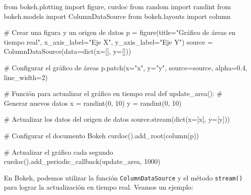 \documentclass[
  a4paper,
]{article}
\newenvironment{Shaded}{}{}
\newcommand{\BuiltInTok}[1]{\textcolor[rgb]{0.84,0.23,0.29}{#1}}
\newcommand{\CommentTok}[1]{\textcolor[rgb]{0.42,0.45,0.49}{#1}}
\newcommand{\DecValTok}[1]{\textcolor[rgb]{0.00,0.36,0.77}{#1}}
\newcommand{\FloatTok}[1]{\textcolor[rgb]{0.00,0.36,0.77}{#1}}
\newcommand{\ImportTok}[1]{\textcolor[rgb]{0.01,0.18,0.38}{#1}}
\newcommand{\KeywordTok}[1]{\textcolor[rgb]{0.84,0.23,0.29}{#1}}
\newcommand{\NormalTok}[1]{\textcolor[rgb]{0.14,0.16,0.18}{#1}}
\newcommand{\OperatorTok}[1]{\textcolor[rgb]{0.14,0.16,0.18}{#1}}
\newcommand{\StringTok}[1]{\textcolor[rgb]{0.01,0.18,0.38}{#1}}
\begin{document}
\begin{Shaded}
\begin{Highlighting}[]
\ImportTok{from}\NormalTok{ bokeh.plotting }\ImportTok{import}\NormalTok{ figure, curdoc}
\ImportTok{from}\NormalTok{ random }\ImportTok{import}\NormalTok{ randint}
\ImportTok{from}\NormalTok{ bokeh.models }\ImportTok{import}\NormalTok{ ColumnDataSource}
\ImportTok{from}\NormalTok{ bokeh.layouts }\ImportTok{import}\NormalTok{ column}

\CommentTok{\# Crear una figura y un origen de datos}
\NormalTok{p }\OperatorTok{=}\NormalTok{ figure(title}\OperatorTok{=}\StringTok{"Gráfico de áreas en tiempo real"}\NormalTok{, x\_axis\_label}\OperatorTok{=}\StringTok{"Eje X"}\NormalTok{, y\_axis\_label}\OperatorTok{=}\StringTok{"Eje Y"}\NormalTok{)}
\NormalTok{source }\OperatorTok{=}\NormalTok{ ColumnDataSource(data}\OperatorTok{=}\BuiltInTok{dict}\NormalTok{(x}\OperatorTok{=}\NormalTok{[], y}\OperatorTok{=}\NormalTok{[]))}

\CommentTok{\# Configurar el gráfico de áreas}
\NormalTok{p.patch(x}\OperatorTok{=}\StringTok{"x"}\NormalTok{, y}\OperatorTok{=}\StringTok{"y"}\NormalTok{, source}\OperatorTok{=}\NormalTok{source, alpha}\OperatorTok{=}\FloatTok{0.4}\NormalTok{, line\_width}\OperatorTok{=}\DecValTok{2}\NormalTok{)}

\CommentTok{\# Función para actualizar el gráfico en tiempo real}
\KeywordTok{def}\NormalTok{ update\_area():}
    \CommentTok{\# Generar nuevos datos}
\NormalTok{    x }\OperatorTok{=}\NormalTok{ randint(}\DecValTok{0}\NormalTok{, }\DecValTok{10}\NormalTok{)}
\NormalTok{    y }\OperatorTok{=}\NormalTok{ randint(}\DecValTok{0}\NormalTok{, }\DecValTok{10}\NormalTok{)}

    \CommentTok{\# Actualizar los datos del origen de datos}
\NormalTok{    source.stream(}\BuiltInTok{dict}\NormalTok{(x}\OperatorTok{=}\NormalTok{[x], y}\OperatorTok{=}\NormalTok{[y]))}

\CommentTok{\# Configurar el documento Bokeh}
\NormalTok{curdoc().add\_root(column(p))}

\CommentTok{\# Actualizar el gráfico cada segundo}
\NormalTok{curdoc().add\_periodic\_callback(update\_area, }\DecValTok{1000}\NormalTok{)}
\end{Highlighting}
\end{Shaded}

En Bokeh, podemos utilizar la función \texttt{ColumnDataSource} y el
método \texttt{stream()} para lograr la actualización en tiempo real.
Veamos un ejemplo:
\end{document}
